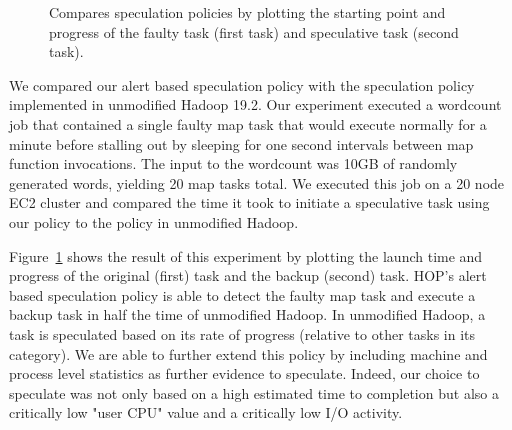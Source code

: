 \begin{figure}[ht]
\ssp
  \centering
  \caption{Compares speculation policies by plotting the starting point and progress of the faulty task (first task) and speculative task (second task).}
\label{fig:taskSpecPolicy}
\end{figure}

We compared our alert based speculation policy with the speculation policy
implemented in unmodified Hadoop 19.2.  Our experiment executed a wordcount job
that contained a single faulty map task that would execute normally for a
minute before stalling out by sleeping for one second intervals between map
function invocations.  The input to the wordcount was 10GB of randomly
generated words, yielding 20 map tasks total.  We executed this job on a 20
node EC2 cluster and compared the time it took to initiate a speculative task
using our policy to the policy in unmodified Hadoop.

Figure~\ref{fig:taskSpecPolicy} shows the result of this experiment by plotting
the launch time and progress of the original (first) task and the backup
(second) task.  HOP's alert based speculation policy is able to detect the
faulty map task and execute a backup task in half the time of unmodified
Hadoop.  In unmodified Hadoop, a task is speculated based on its rate of
progress (relative to other tasks in its category).  We are able to further
extend this policy by including machine and process level statistics as further
evidence to speculate.  Indeed, our choice to speculate was not only based on a
high estimated time to completion but also a critically low "user CPU" value
and a critically low I/O activity.

